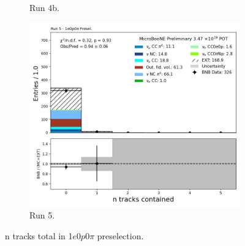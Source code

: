 \begin{figure}[H]
\begin{subfigure}[t]{0.32\linewidth}
        \caption{Run 4b.}
    \end{subfigure}%
    \hspace{0.2cm}%
    \begin{subfigure}[t]{0.32\linewidth}
        \includegraphics[width=\linewidth]{technote/Appendix_Preselection/Figures/1e0p0pi/Run5/n_tracks_tot_Run5_1e0p0pi_Presel.png}
        \caption{Run 5.}
    \end{subfigure}
    \caption{n tracks total in 1$e$0$p$0$\pi$ preselection.}
\end{figure}

